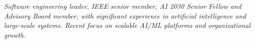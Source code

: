{\selectfont
	\begin{justify}\textit{Software engineering leader, IEEE senior member, AI 2030 Senior Fellow and Advisory Board member, with significant experience in artificial intelligence and large-scale systems. Recent focus on scalable AI/ML platforms and organizational growth.}\end{justify}
}